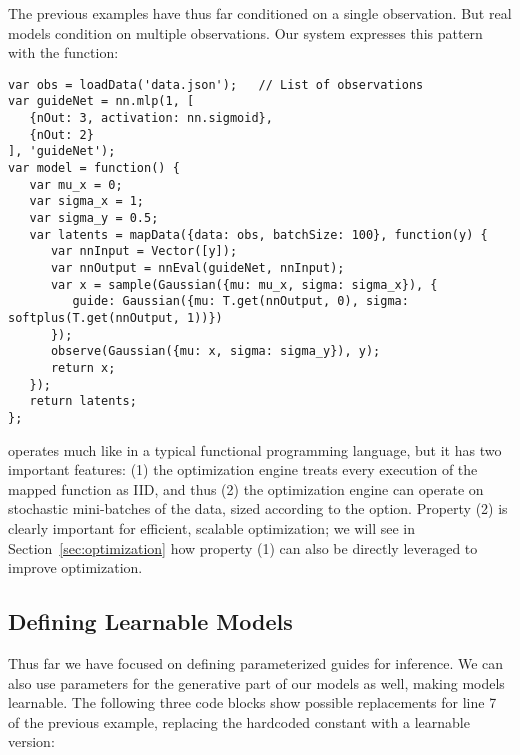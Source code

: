 The previous examples have thus far conditioned on a single observation. But real models condition on multiple observations. Our system expresses this pattern with the  function:
\begin{lstlisting}
var obs = loadData('data.json');   // List of observations
var guideNet = nn.mlp(1, [
   {nOut: 3, activation: nn.sigmoid},
   {nOut: 2}
], 'guideNet');
var model = function() {
   var mu_x = 0;
   var sigma_x = 1;
   var sigma_y = 0.5;
   var latents = mapData({data: obs, batchSize: 100}, function(y) {
      var nnInput = Vector([y]);
      var nnOutput = nnEval(guideNet, nnInput);
      var x = sample(Gaussian({mu: mu_x, sigma: sigma_x}), {
         guide: Gaussian({mu: T.get(nnOutput, 0), sigma: softplus(T.get(nnOutput, 1))})
      });
      observe(Gaussian({mu: x, sigma: sigma_y}), y);
      return x;
   });
   return latents;
};
\end{lstlisting}
 operates much like  in a typical functional programming language, but it has two important features: (1) the optimization engine treats every execution of the mapped function as IID, and thus (2) the optimization engine can operate on stochastic mini-batches of the data, sized according to the  option.
Property (2) is clearly important for efficient, scalable optimization; we will see in Section~\ref{sec:optimization} how property (1) can also be directly leveraged to improve optimization.


\subsection{Defining Learnable Models}

Thus far we have focused on defining parameterized guides for inference.
We can also use parameters for the generative part of our models as well, making models learnable.
The following three code blocks show possible replacements for line 7 of the previous example, replacing the hardcoded constant  with a learnable version:


